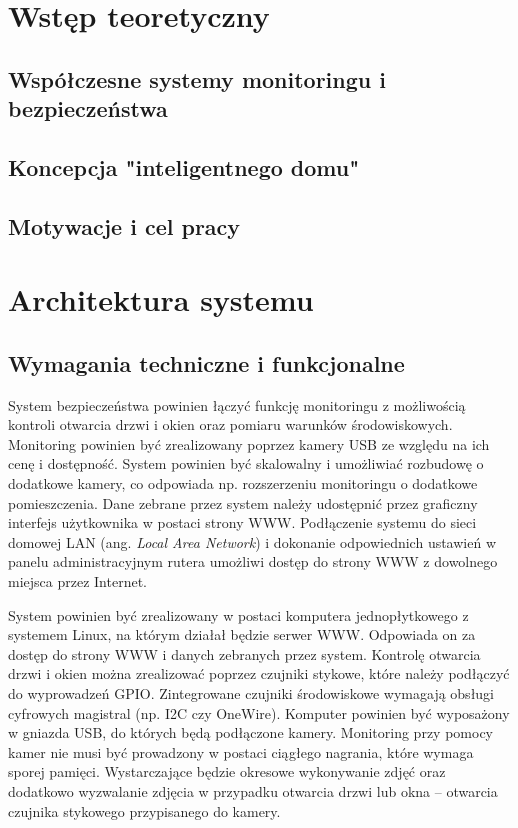 \documentclass[a4paper,12pt,twoside]{article}
\begin{document}


\tableofcontents
\setcounter{tocdepth}{2}
\newpage

\section{Wstęp teoretyczny}

\subsection{Współczesne systemy monitoringu i bezpieczeństwa}

\subsection{Koncepcja "inteligentnego domu"}

\subsection{Motywacje i cel pracy}
\newpage

\section{Architektura systemu}

\subsection{Wymagania techniczne i funkcjonalne}
System bezpieczeństwa powinien łączyć funkcję monitoringu z możliwością kontroli otwarcia drzwi i okien oraz pomiaru warunków środowiskowych. Monitoring powinien być zrealizowany poprzez kamery USB ze względu na ich cenę i dostępność. System powinien być skalowalny i umożliwiać rozbudowę o dodatkowe kamery, co odpowiada np. rozszerzeniu monitoringu o dodatkowe pomieszczenia. Dane zebrane przez system należy udostępnić przez graficzny interfejs użytkownika w postaci strony WWW. Podłączenie systemu do sieci domowej LAN (ang. \textit{Local Area Network}) i dokonanie odpowiednich ustawień w panelu administracyjnym rutera umożliwi dostęp do strony WWW z dowolnego miejsca przez Internet.

System powinien być zrealizowany w postaci komputera jednopłytkowego z systemem Linux, na którym działał będzie serwer WWW. Odpowiada on za dostęp do strony WWW i danych zebranych przez system. Kontrolę otwarcia drzwi i okien można zrealizować poprzez czujniki stykowe, które należy podłączyć do wyprowadzeń GPIO. Zintegrowane czujniki środowiskowe wymagają obsługi cyfrowych magistral (np. I2C czy OneWire). Komputer powinien być wyposażony w gniazda USB, do których będą podłączone kamery. Monitoring przy pomocy kamer nie musi być prowadzony w postaci ciągłego nagrania, które wymaga sporej pamięci. Wystarczające będzie okresowe wykonywanie zdjęć oraz dodatkowo wyzwalanie zdjęcia w przypadku otwarcia drzwi lub okna -- otwarcia czujnika stykowego przypisanego do kamery. 
\end{document}
